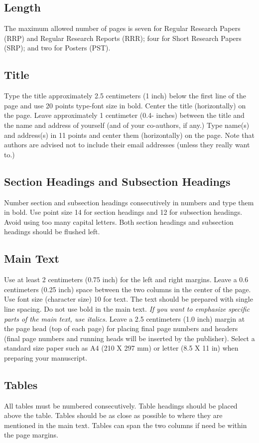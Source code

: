 \documentclass[conference]{worldcomp}
\begin{document}
\subsection{Length}
The maximum allowed number of pages is seven for Regular Research Papers (RRP) 
and Regular Research Reports (RRR); four for Short Research Papers (SRP); and two for Posters (PST).

\subsection{Title}
Type the title approximately 2.5 centimeters (1 inch) below the first line of the 
page and use 20 points type-font size in bold. Center the title (horizontally) on the page. 
Leave approximately 1 centimeter (0.4- inches) between the title and the name and 
address of yourself (and of your co-authors, if any.) Type name(s) and address(s) in 11 points 
and center them (horizontally) on the page. Note that authors are advised not to include 
their email addresses (unless they really want to.)

\subsection{Section Headings and Subsection Headings}
Number section and subsection headings consecutively in numbers and type 
them in bold. Use point size 14 for section headings and 12 for subsection headings. 
Avoid using too many capital letters. Both section headings and 
subsection headings should be flushed left.

\subsection{Main Text}
Use at least 2 centimeters (0.75 inch) for the left and right margins. 
Leave a 0.6 centimeters (0.25 inch) space between the two columns in the 
center of the page. Use font size (character size) 10 for text. The text 
should be prepared with single line spacing. Do not use bold in the main text. 
{\em If you want to emphasize specific parts of the main text, use italics.} Leave a 
2.5 centimeters (1.0 inch) margin at the page head (top of each page) for placing 
final page numbers and headers (final page numbers and running heads will be inserted 
by the publisher). Select a standard size paper such as A4 (210 X 297 mm) or letter 
(8.5 X 11 in) when preparing your manuscript.


\subsection{Tables}\label{sec:table}
All tables must be numbered consecutively. Table headings should be placed 
above the table. Tables should be as close as possible to where they 
are mentioned in the main text. Tables can span the two columns if 
need be within the page margins.
\end{document}
